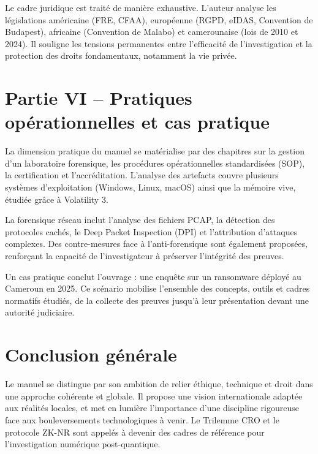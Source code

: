 \documentclass[12pt, a4paper]{article}
\begin{document}
\begin{Large}
\begin{Large}
Le cadre juridique est traité de manière exhaustive. L'auteur analyse les législations américaine (FRE, CFAA), européenne (RGPD, eIDAS, Convention de Budapest), africaine (Convention de Malabo) et camerounaise (lois de 2010 et 2024). Il souligne les tensions permanentes entre l'efficacité de l'investigation et la protection des droits fondamentaux, notamment la vie privée.

\section*{Partie VI -- Pratiques opérationnelles et cas pratique}

La dimension pratique du manuel se matérialise par des chapitres sur la gestion d'un laboratoire forensique, les procédures opérationnelles standardisées (SOP), la certification et l'accréditation. L'analyse des artefacts couvre plusieurs systèmes d'exploitation (Windows, Linux, macOS) ainsi que la mémoire vive, étudiée grâce à Volatility 3.

La forensique réseau inclut l'analyse des fichiers PCAP, la détection des protocoles cachés, le Deep Packet Inspection (DPI) et l'attribution d'attaques complexes. Des contre-mesures face à l'anti-forensique sont également proposées, renforçant la capacité de l'investigateur à préserver l'intégrité des preuves.

Un cas pratique conclut l'ouvrage : une enquête sur un ransomware déployé au Cameroun en 2025. Ce scénario mobilise l'ensemble des concepts, outils et cadres normatifs étudiés, de la collecte des preuves jusqu'à leur présentation devant une autorité judiciaire.

\section*{Conclusion générale}

Le manuel se distingue par son ambition de relier éthique, technique et droit dans une approche cohérente et globale. Il propose une vision internationale adaptée aux réalités locales, et met en lumière l'importance d'une discipline rigoureuse face aux bouleversements technologiques à venir. Le Trilemme CRO et le protocole ZK-NR sont appelés à devenir des cadres de référence pour l'investigation numérique post-quantique.
\end{Large}

\end{Large}
\end{document}
